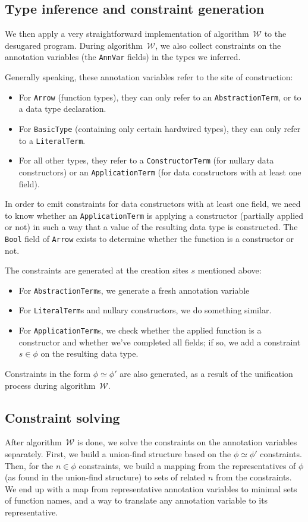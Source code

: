 \documentclass[a4paper]{scrartcl}
\newcommand{\algow}{algorithm~$\mathcal{W}$}
\begin{document}
\subsection{Type inference and constraint generation}
\label{sec:algow-phase}
We then apply a very straightforward implementation of \algow{} to the
desugared program. During \algow{}, we also collect constraints on
the annotation variables (the \texttt{AnnVar} fields) in the types we inferred.

Generally speaking, these annotation variables refer to the site of
construction:
\begin{itemize}
\item
    For \texttt{Arrow} (function types), they can only refer to
    an \texttt{AbstractionTerm}, or to a data type declaration.
\item
    For \texttt{BasicType} (containing only certain hardwired types), they can
    only refer to a \texttt{LiteralTerm}.
\item
    For all other types, they refer to a \texttt{ConstructorTerm}
    (for nullary data constructors) or an \texttt{ApplicationTerm}
    (for data constructors with at least one field).
\end{itemize}

In order to emit constraints for data constructors with at least one field,
we need to know whether an \texttt{ApplicationTerm} is applying a constructor
(partially applied or not) in such a way that a value of the resulting data
type is constructed. The \texttt{Bool} field of \texttt{Arrow} exists to
determine whether the function is a constructor or not.

The constraints are generated at the creation sites $s$ mentioned above:
\begin{itemize}
\item
    For \texttt{AbstractionTerm}s, we generate a fresh annotation variable
\item
    For \texttt{LiteralTerm}s and nullary constructors, we do something similar.
\item
    For \texttt{ApplicationTerm}s, we check whether the applied function is
    a constructor and whether we've completed all fields; if so, we add
    a constraint $s \in \phi$ on the resulting data type.
\end{itemize}
Constraints in the form $\phi \simeq \phi'$ are also generated, as a result
of the unification process during \algow{}.

\subsection{Constraint solving}
After \algow{} is done, we solve the constraints on the annotation variables
separately. First, we build a union-find structure based on the
$\phi \simeq \phi'$ constraints. Then, for the $n \in \phi$ constraints,
we build a mapping from the representatives of $\phi$ (as found in
the union-find structure) to sets of related $n$ from the constraints.
We end up with a map from representative annotation variables to minimal sets
of function names, and a way to translate any annotation variable to its
representative.
\end{document}
